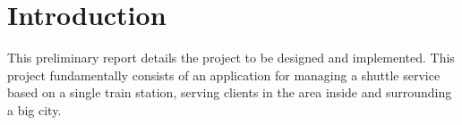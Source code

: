 \chapter{Introduction}
This preliminary report details the project to be designed and implemented.
This project fundamentally consists of an application for managing a shuttle service based on a single train station, serving clients in the area inside and surrounding a big city.
